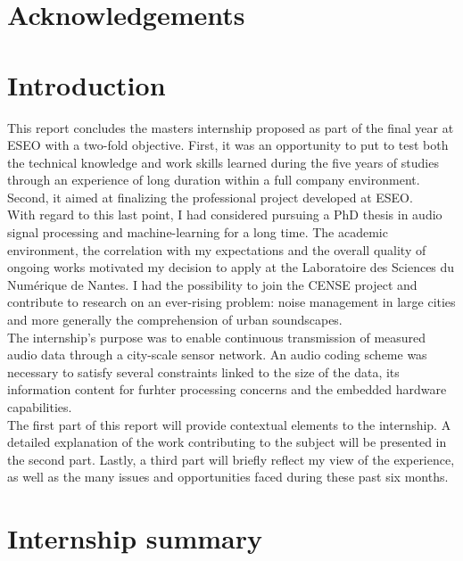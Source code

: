 \documentclass[12pt,times,onecolumn]{article}
\begin{document}


\section*{Acknowledgements}

\clearpage
\section*{Introduction}
This report concludes the masters internship proposed as part of the final year at ESEO with a two-fold objective. First, it was an opportunity to put to test both the technical knowledge and work skills learned during the five years of studies through an experience of long duration within a full company environment. Second, it aimed at finalizing the professional project developed at ESEO.\\

With regard to this last point, I had considered pursuing a PhD thesis in audio signal processing and machine-learning for a long time. The academic environment, the correlation with my expectations and the overall quality of ongoing works motivated my decision to apply at the Laboratoire des Sciences du Num\'erique de Nantes. I had the possibility to join the CENSE project and contribute to research on an ever-rising problem: noise management in large cities and more generally the comprehension of urban soundscapes.\\

The internship's purpose was to enable continuous transmission of measured audio data through a city-scale sensor network. An audio coding scheme was necessary to satisfy several constraints linked to the size of the data, its information content for furhter processing concerns and the embedded hardware capabilities.\\

The first part of this report will provide contextual elements to the internship. A detailed explanation of the work contributing to the subject will be presented in the second part. Lastly, a third part will briefly reflect my view of the experience, as well as the many issues and opportunities faced during these past six months.


\clearpage
\section*{Internship summary}
\end{document}
